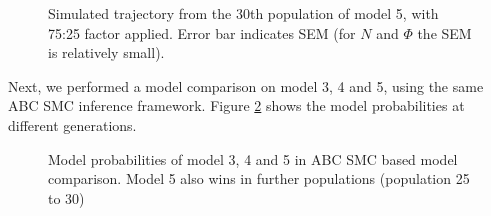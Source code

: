 \begin{figure}[ht!]
    \begin{center}
    \end{center}

    \caption[Simulated trajectory from the 30th population of model 5, with 75:25 factor applied]{Simulated trajectory from the 30th population of model 5, with 75:25 factor applied. Error bar indicates SEM (for $N$ and $\Phi$ the SEM is relatively small).}
    \label{fig:overfit}
\end{figure}


Next, we performed a model comparison on model 3, 4 and 5, using the same ABC SMC inference framework. Figure \ref{fig:model345cmp} shows the model probabilities at different generations.

\begin{figure}[ht!]
    \begin{center}
    \end{center}

    \caption[Model probabilities of model 3, 4 and 5]{Model probabilities of model 3, 4 and 5 in ABC SMC based model comparison. Model 5 also wins in further populations (population 25 to 30)}
    \label{fig:model345cmp}
\end{figure}

